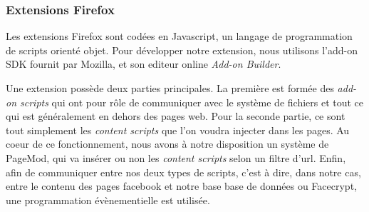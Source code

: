 \documentclass[a4paper,11pt,french]{article}
\begin{document}
\subsubsection{Extensions Firefox}
Les extensions Firefox sont codées en Javascript, un langage de programmation de 
scripts orienté objet. Pour développer notre extension, nous utilisons l'add-on 
SDK fournit par Mozilla, et son editeur online \emph{Add-on Builder}.

Une extension possède deux parties principales. La première est formée des 
\emph{add-on scripts} qui ont pour rôle de communiquer avec le système de fichiers 
et tout ce qui est généralement en dehors des pages web. Pour la seconde partie, 
ce sont tout simplement les \emph{content scripts} que l'on voudra injecter dans
les pages. Au coeur de ce fonctionnement, nous avons à notre disposition un système 
de PageMod, qui va insérer ou non les \emph{content scripts} selon un filtre d'url. 
Enfin, afin de communiquer entre nos deux types de scripts, c'est à dire, dans notre
cas, entre le contenu des pages facebook et notre base base de données ou Facecrypt, 
une programmation évènementielle est utilisée.
\end{document}
